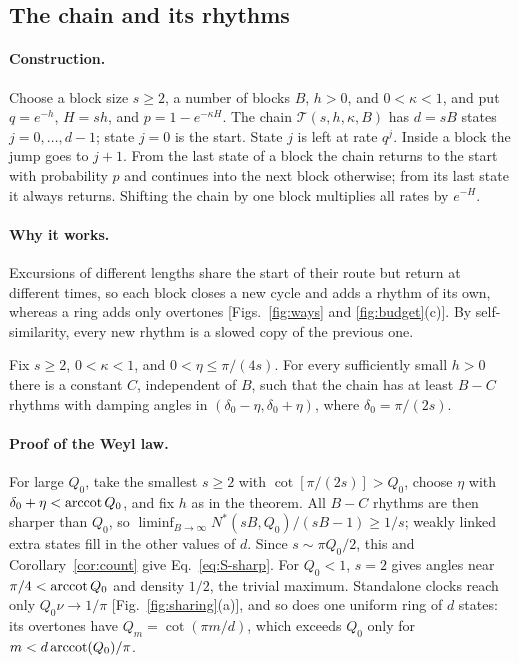 \subsection{The chain and its rhythms}

\paragraph*{Construction.} Choose a block size $s\ge2$, a number of blocks $B$, $h>0$, and $0<\kappa<1$, and put $q=e^{-h}$, $H=sh$, and $p=1-e^{-\kappa H}$. The chain $\mathcal T(s,h,\kappa,B)$ has $d=sB$ states $j=0,\dots,d-1$; state $j=0$ is the start. State $j$ is left at rate $q^j$. Inside a block the jump goes to $j+1$. From the last state of a block the chain returns to the start with probability $p$ and continues into the next block otherwise; from its last state it always returns. Shifting the chain by one block multiplies all rates by $e^{-H}$.

\paragraph*{Why it works.} Excursions of different lengths share the start of their route but return at different times, so each block closes a new cycle and adds a rhythm of its own, whereas a ring adds only overtones [Figs.~\ref{fig:ways} and \ref{fig:budget}(c)]. By self-similarity, every new rhythm is a slowed copy of the previous one.

\begin{theorem}\label{thm:theta}
Fix $s\ge2$, $0<\kappa<1$, and $0<\eta\le\pi/(4s)$. For every sufficiently small $h>0$ there is a constant $C$, independent of $B$, such that the chain has at least $B-C$ rhythms with damping angles in $(\delta_0-\eta,\delta_0+\eta)$, where $\delta_0=\pi/(2s)$.
\end{theorem}

\paragraph*{Proof of the Weyl law.} For large $Q_0$, take the smallest $s\ge2$ with $\cot[\pi/(2s)]>Q_0$, choose $\eta$ with $\delta_0+\eta<\operatorname{arccot} Q_0$, and fix $h$ as in the theorem. All $B-C$ rhythms are then sharper than $Q_0$, so $\liminf_{B\to\infty}N^*(sB,Q_0)/(sB-1)\ge1/s$; weakly linked extra states fill in the other values of $d$. Since $s\sim\pi Q_0/2$, this and Corollary~\ref{cor:count} give Eq.~\eqref{eq:S-sharp}. For $Q_0<1$, $s=2$ gives angles near $\pi/4<\operatorname{arccot} Q_0$ and density $1/2$, the trivial maximum. Standalone clocks reach only $Q_0\nu\to1/\pi$ [Fig.~\ref{fig:sharing}(a)], and so does one uniform ring of $d$ states: its overtones have $Q_m=\cot(\pi m/d)$, which exceeds $Q_0$ only for $m<d\operatorname{arccot}(Q_0)/\pi$.

